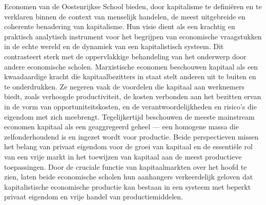 Economen van de Oostenrijkse School bieden, door kapitalisme te definiëren en te verklaren binnen de context van menselijk handelen, de meest uitgebreide en coherente benadering van kapitalisme. Hun visie dient als een krachtig en praktisch analytisch instrument voor het begrijpen van economische vraagstukken in de echte wereld en de dynamiek van een kapitalistisch systeem. Dit contrasteert sterk met de oppervlakkige behandeling van het onderwerp door andere economische scholen. Marxistische economen beschouwen kapitaal als een kwaadaardige kracht die kapitaalbezitters in staat stelt anderen uit te buiten en te onderdrukken. Ze negeren vaak de voordelen die kapitaal aan werknemers biedt, zoals verhoogde productiviteit, de kosten verbonden aan het bezitten ervan in de vorm van opportuniteitskosten, en de verantwoordelijkheden en risico's die eigendom met zich meebrengt. Tegelijkertijd beschouwen de meeste mainstream economen kapitaal als een geaggregeerd geheel --- een homogene massa die zelfonderhoudend is en ingezet wordt voor productie. Beide perspectieven missen het belang van privaat eigendom voor de groei van kapitaal en de essentiële rol van een vrije markt in het toewijzen van kapitaal aan de meest productieve toepassingen. Door de cruciale functie van kapitaalmarkten over het hoofd te zien, laten beide economische scholen hun aanhangers verkeerdelijk geloven dat kapitalistische economische productie kan bestaan in een systeem met beperkt privaat eigendom en vrije handel van productiemiddelen.

